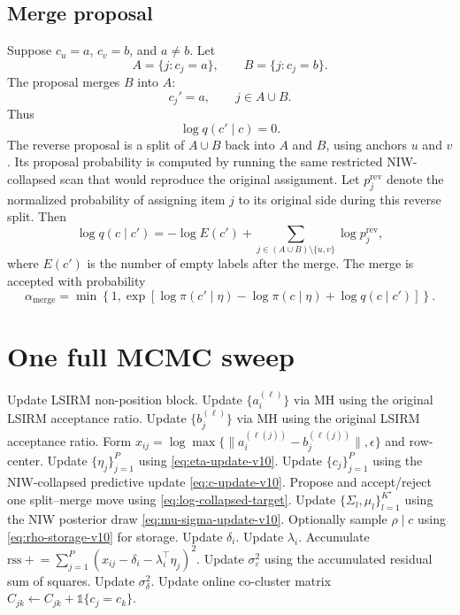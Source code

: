 \documentclass[11pt]{article}
\begin{document}
\subsection{Merge proposal}

Suppose $c_u=a$, $c_v=b$, and $a\neq b$.  Let
\[
    A=\{j:c_j=a\},
    \qquad
    B=\{j:c_j=b\}.
\]
The proposal merges $B$ into $A$:
\[
    c_j'=a,
    \qquad j\in A\cup B.
\]
Thus
\[
    \log q(c'\mid c)=0.
\]
The reverse proposal is a split of $A\cup B$ back into $A$ and $B$, using
anchors $u$ and $v$.  Its proposal probability is computed by running the
same restricted NIW-collapsed scan that would reproduce the original
assignment.  Let $p_j^{\mathrm{rev}}$ denote the normalized probability of
assigning item $j$ to its original side during this reverse split.  Then
\begin{equation}
    \log q(c\mid c')
    =
    -\log E(c')+
    \sum_{j\in (A\cup B)\setminus\{u,v\}}
    \log p_j^{\mathrm{rev}},
\end{equation}
where $E(c')$ is the number of empty labels after the merge.  The merge is
accepted with probability
\begin{equation}
    \alpha_{\mathrm{merge}}
    =
    \min\left\{1,
    \exp\left[
    \log\pi(c'\mid\eta)-\log\pi(c\mid\eta)
    +\log q(c\mid c')
    \right]
    \right\}.
\end{equation}

\section{One full MCMC sweep}

\begin{algorithm}[H]
\caption{One sweep of joint LSIRM + PPCA-mixture with NIW predictive and split--merge moves}
\begin{algorithmic}[1]
\State Update LSIRM non-position block.
\State Update $\{a_i^{(\ell)}\}$ via MH using the original LSIRM acceptance ratio.
\State Update $\{b_j^{(\ell)}\}$ via MH using the original LSIRM acceptance ratio.
\State Form $x_{ij}=\log\max\{\|a_i^{(\ell(j))}-b_j^{(\ell(j))}\|,\epsilon\}$ and row-center.
    \State Update $\{\eta_j\}_{j=1}^P$ using \eqref{eq:eta-update-v10}.
    \State Update $\{c_j\}_{j=1}^P$ using the NIW-collapsed predictive update \eqref{eq:c-update-v10}.
        \State Propose and accept/reject one split--merge move using \eqref{eq:log-collapsed-target}.
    \EndFor
    \State Update $\{\Sigma_l,\mu_l\}_{l=1}^{K^\star}$ using the NIW posterior draw \eqref{eq:mu-sigma-update-v10}.
    \State Optionally sample $\rho\mid c$ using \eqref{eq:rho-storage-v10} for storage.
        \State Update $\delta_i$.
        \State Update $\lambda_i$.
        \State Accumulate $\mathrm{rss}\mathrel{+}=\sum_{j=1}^P(x_{ij}-\delta_i-\lambda_i^\top\eta_j)^2$.
    \EndFor
    \State Update $\sigma_\varepsilon^2$ using the accumulated residual sum of squares.
    \State Update $\sigma_\delta^2$.
    \State Update online co-cluster matrix $C_{jk}\leftarrow C_{jk}+\mathbb 1\{c_j=c_k\}$.
\EndIf
\end{algorithmic}
\end{algorithm}
\end{document}
